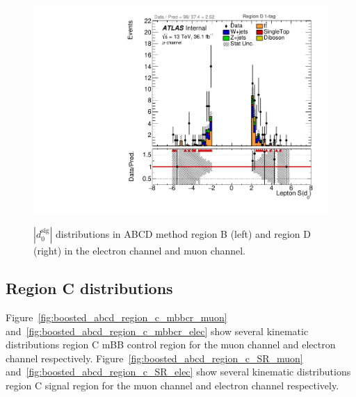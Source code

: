 \begin{figure}[!htbp]
\begin{center}
\includegraphics[scale=0.33]{./figures/boosted/ABCD/muon_Inc_RegionD_Lep_d0sigL}\\
\caption{$|d_{0}^{\textrm{sig}}|$ distributions in ABCD method region B (left) and region D (right) in the electron channel and muon channel.}
\label{fig:boosted_abcd_region_bd_d0sig}
\end{center}
\end{figure}

\FloatBarrier
%
%
\subsection{Region C distributions}
\label{app:boosted_qcd_region_c}

Figure~\ref{fig:boosted_abcd_region_c_mbbcr_muon} and~\ref{fig:boosted_abcd_region_c_mbbcr_elec} show several kinematic distributions
region C mBB control region for the muon channel and electron channel respectively. Figure~\ref{fig:boosted_abcd_region_c_SR_muon}
and~\ref{fig:boosted_abcd_region_c_SR_elec} show several kinematic distributions region C signal region for the muon channel and 
electron channel respectively.


